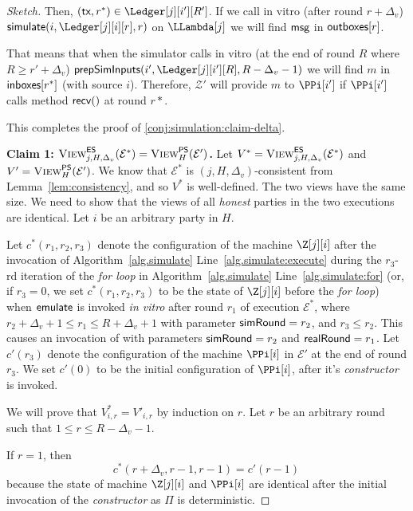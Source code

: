 \begin{proof}[Sketch]
  Then, $(\tx, r^*) \in \Ledger[j][i'][R']$. If we call in vitro
  (after round $r + \Delta_v$) $\simulate(i, \Ledger[j][i][r], r)$
  on $\LLambda[j]$ we will find $\textsf{msg}$ in $\textsf{outboxes}[r]$.

  That means that when the simulator calls in vitro
  (at the end of round $R$ where $R \geq r' + \Delta_v$) $\prepareSimulationInputs(i', \Ledger[j][i'][R], R - \Delta_v - 1)$
  we will find $m$ in $\textsf{inboxes}[r^*]$ (with source $i$).
  Therefore, $\mathcal{Z}'$ will provide $m$ to $\PPi[i']$
  if $\PPi[i']$ calls method $\textsf{recv}()$ at round $r*$.

  This completes the proof of \ref{conj:simulation:claim-delta}.


  \noindent
  \textbf{Claim 1: $\textsc{View}^{\textsf{ES}}_{j,H,\Delta_v}(\mathcal{E}^*) = \textsc{View}^{\textsf{PS}}_H(\mathcal{E}')$.}
  Let $V^* = \textsc{View}^{\textsf{ES}}_{j,H,\Delta_v}(\mathcal{E}^*)$ and
  $V' = \textsc{View}^{\textsf{PS}}_H(\mathcal{E}')$.
  We know that $\mathcal{E}^*$ is $(j, H, \Delta_v)$-consistent
  from Lemma~\ref{lem:consistency}, and so $V^*$
  is well-defined.
  The two views have the same size.
  We need to show
  that the views of all \emph{honest} parties in the two executions are identical.
  Let $i$ be an arbitrary party in $H$.

  Let $c^*(r_1, r_2, r_3)$ denote the configuration
  of the machine $\Z[j][i]$ after the invocation of
  Algorithm~\ref{alg.simulate} Line~\ref{alg.simulate:execute}
  during the $r_3$-rd iteration of the \emph{for loop} in
  Algorithm~\ref{alg.simulate} Line~\ref{alg.simulate:for}
  (or, if $r_3 = 0$, we set $c^*(r_1, r_2, r_3)$ to be the state of
  $\Z[j][i]$ before the \emph{for loop})
  when $\textsf{emulate}$ is
  invoked \emph{in vitro} after round $r_1$ of execution $\mathcal{E}^*$,
  where $r_2 + \Delta_v + 1 \leq r_1 \leq R + \Delta_v + 1$ with parameter
  $\textsf{simRound} = r_2$, and $r_3 \leq r_2$.
  This causes an invocation of \simulate with parameters
  $\textsf{simRound} = r_2$ and $\textsf{realRound} = r_1$.
  Let $c'(r_3)$ denote the configuration of the machine $\PPi[i]$
  in $\mathcal{E}'$ at the end of round $r_3$.
  We set $c'(0)$ to be the initial configuration of $\PPi[i]$,
  after it's \emph{constructor} is invoked.

  We will prove that $V^*_{i,r} = V'_{i,r}$ by induction on $r$.
  Let $r$ be an arbitrary round such that $1 \leq r \leq R - \Delta_v - 1$.

  If $r = 1$, then
  \begin{equation}\label{conj:simulation:ind-hyp}
    c^*(r + \Delta_v, r - 1, r - 1) = c'(r - 1)\,
  \end{equation}
  because the state of machine $\Z[j][i]$ and $\PPi[i]$ are identical
  after the initial invocation of the \emph{constructor} as $\Pi$
  is deterministic.


\end{proof}
